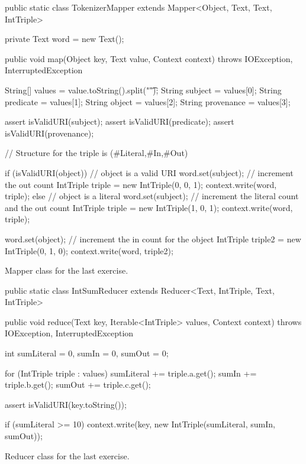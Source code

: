 \documentclass[a4paper,11pt]{report}
\begin{document}
\begin{listing}[ht]
\centering
\begin{javacode}
public static class TokenizerMapper extends Mapper<Object, Text, Text, IntTriple> {

    private Text word = new Text();

    public void map(Object key, Text value, Context context)
            throws IOException, InterruptedException {

        String[] values = value.toString().split("\t");
        String subject = values[0];
        String predicate = values[1];
        String object = values[2];
        String provenance = values[3];

        assert isValidURI(subject);
        assert isValidURI(predicate);
        assert isValidURI(provenance);

        // Structure for the triple is (#Literal,#In,#Out)

        if (isValidURI(object)) { // object is a valid URI
            word.set(subject);
            // increment the out count
            IntTriple triple = new IntTriple(0, 0, 1);
            context.write(word, triple);
        } else { // object is a literal
            word.set(subject);
            // increment the literal count and the out count
            IntTriple triple = new IntTriple(1, 0, 1);
            context.write(word, triple);
        }

        word.set(object);
        // increment the in count for the object
        IntTriple triple2 = new IntTriple(0, 1, 0);
        context.write(word, triple2);
    }
}
\end{javacode}
\caption{Mapper class for the last exercise.}
\label{lst:ex5-b}
\end{listing}

\begin{listing}[h]
\centering
\begin{javacode}
public static class IntSumReducer extends Reducer<Text, IntTriple, Text, IntTriple> {
    public void reduce(Text key, Iterable<IntTriple> values, Context context)
            throws IOException, InterruptedException {

        int sumLiteral = 0, sumIn = 0, sumOut = 0;

        for (IntTriple triple : values) {
            sumLiteral += triple.a.get();
            sumIn += triple.b.get();
            sumOut += triple.c.get();
        }

        assert isValidURI(key.toString());

        if (sumLiteral >= 10) {
            context.write(key, new IntTriple(sumLiteral, sumIn, sumOut));
        }
    }
}
\end{javacode}
\caption{Reducer class for the last exercise.}
\label{lst:ex5-b}
\end{listing}
\end{document}
